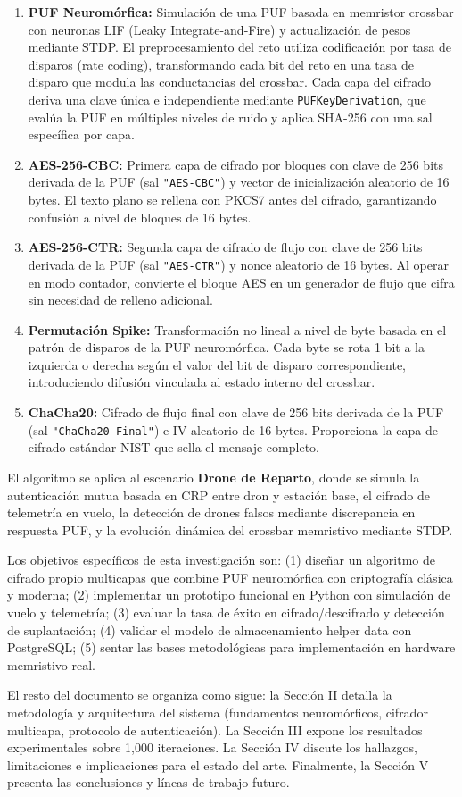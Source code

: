 \begin{enumerate}
    \item \textbf{PUF Neuromórfica:} Simulación de una PUF basada en memristor crossbar con neuronas LIF (Leaky Integrate-and-Fire) y actualización de pesos mediante STDP. El preprocesamiento del reto utiliza codificación por tasa de disparos (rate coding), transformando cada bit del reto en una tasa de disparo que modula las conductancias del crossbar. Cada capa del cifrado deriva una clave única e independiente mediante \texttt{PUFKeyDerivation}, que evalúa la PUF en múltiples niveles de ruido y aplica SHA-256 con una sal específica por capa.
    \item \textbf{AES-256-CBC:} Primera capa de cifrado por bloques con clave de 256 bits derivada de la PUF (sal \texttt{"AES-CBC"}) y vector de inicialización aleatorio de 16 bytes. El texto plano se rellena con PKCS7 antes del cifrado, garantizando confusión a nivel de bloques de 16 bytes.
    \item \textbf{AES-256-CTR:} Segunda capa de cifrado de flujo con clave de 256 bits derivada de la PUF (sal \texttt{"AES-CTR"}) y nonce aleatorio de 16 bytes. Al operar en modo contador, convierte el bloque AES en un generador de flujo que cifra sin necesidad de relleno adicional.
    \item \textbf{Permutación Spike:} Transformación no lineal a nivel de byte basada en el patrón de disparos de la PUF neuromórfica. Cada byte se rota 1 bit a la izquierda o derecha según el valor del bit de disparo correspondiente, introduciendo difusión vinculada al estado interno del crossbar.
    \item \textbf{ChaCha20:} Cifrado de flujo final con clave de 256 bits derivada de la PUF (sal \texttt{"ChaCha20-Final"}) e IV aleatorio de 16 bytes. Proporciona la capa de cifrado estándar NIST que sella el mensaje completo.
\end{enumerate}

El algoritmo se aplica al escenario \textbf{Drone de Reparto}, donde se simula la autenticación mutua basada en CRP entre dron y estación base, el cifrado de telemetría en vuelo, la detección de drones falsos mediante discrepancia en respuesta PUF, y la evolución dinámica del crossbar memristivo mediante STDP.

Los objetivos específicos de esta investigación son: (1) diseñar un algoritmo de cifrado propio multicapas que combine PUF neuromórfica con criptografía clásica y moderna; (2) implementar un prototipo funcional en Python con simulación de vuelo y telemetría; (3) evaluar la tasa de éxito en cifrado/descifrado y detección de suplantación; (4) validar el modelo de almacenamiento helper data con PostgreSQL; (5) sentar las bases metodológicas para implementación en hardware memristivo real.

El resto del documento se organiza como sigue: la Sección II detalla la metodología y arquitectura del sistema (fundamentos neuromórficos, cifrador multicapa, protocolo de autenticación). La Sección III expone los resultados experimentales sobre 1,000 iteraciones. La Sección IV discute los hallazgos, limitaciones e implicaciones para el estado del arte. Finalmente, la Sección V presenta las conclusiones y líneas de trabajo futuro.
